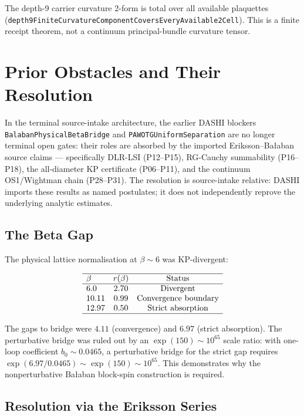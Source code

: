 \documentclass[11pt,a4paper]{article}
\begin{document}
The depth-9 carrier curvature 2-form is total over all available plaquettes
(\texttt{depth9FiniteCurvatureComponentCoversEveryAvailable2Cell}).  This is a
finite receipt theorem, not a continuum principal-bundle curvature tensor.

\section{Prior Obstacles and Their Resolution}

In the terminal source-intake architecture, the earlier DASHI blockers
\texttt{BalabanPhysicalBetaBridge} and
\texttt{PAWOTGUniformSeparation} are no longer terminal open gates:
their roles are absorbed by the imported Eriksson--Ba{\l}aban source
claims --- specifically DLR-LSI (P12--P15), RG-Cauchy summability
(P16--P18), the all-diameter KP certificate (P06--P11), and the continuum
OS1/Wightman chain (P28--P31).  The resolution is source-intake relative:
DASHI imports these results as named postulates; it does not independently
reprove the underlying analytic estimates.

\subsection{The Beta Gap}

The physical lattice normalisation at $\beta \sim 6$ was KP-divergent:

\[
\begin{array}{lcc}
\hline
\beta & r(\beta) & \text{Status} \\
\hline
6.0   & 2.70 & \text{Divergent} \\
10.11 & 0.99 & \text{Convergence boundary} \\
12.97 & 0.50 & \text{Strict absorption} \\
\hline
\end{array}
\]

The gaps to bridge were $4.11$ (convergence) and $6.97$ (strict absorption).
The perturbative bridge was ruled out by an $\exp(150) \sim 10^{65}$ scale
ratio: with one-loop coefficient $b_0 \sim 0.0465$, a perturbative bridge for
the strict gap requires $\exp(6.97 / 0.0465) \sim \exp(150) \sim 10^{65}$.
This demonstrates why the nonperturbative Ba{\l}aban block-spin construction
is required.

\subsection{Resolution via the Eriksson Series}
\end{document}
